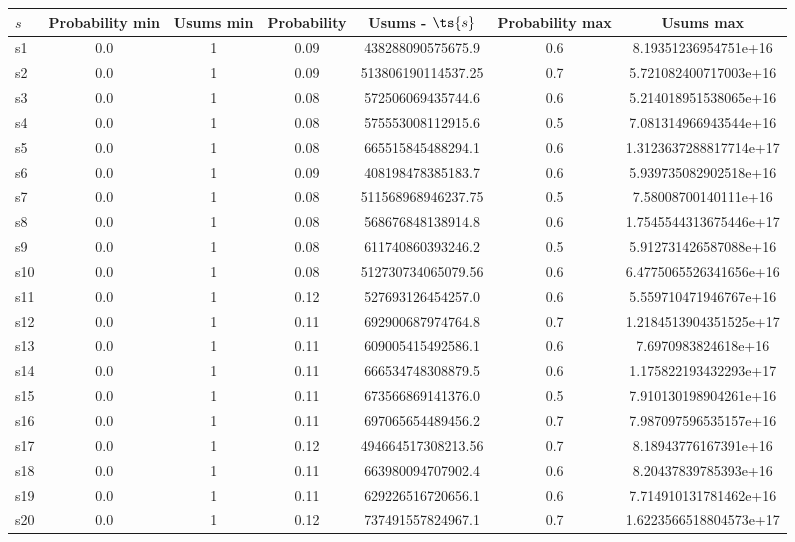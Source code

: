 \documentclass{article}
\begin{document}
\noindent\begin{tabular}{|l|c|c|c|c|c|c|}
\hline
$s$& Probability min & Usums min & Probability & Usums - $\ts{s}$ & Probability max & Usums max\\
\hline
s1 &0.0 & 1 & 0.09 & 438288090575675.9 & 0.6 & 8.19351236954751e+16\\
\hline
s2 &0.0 & 1 & 0.09 & 513806190114537.25 & 0.7 & 5.721082400717003e+16\\
\hline
s3 &0.0 & 1 & 0.08 & 572506069435744.6 & 0.6 & 5.214018951538065e+16\\
\hline
s4 &0.0 & 1 & 0.08 & 575553008112915.6 & 0.5 & 7.081314966943544e+16\\
\hline
s5 &0.0 & 1 & 0.08 & 665515845488294.1 & 0.6 & 1.3123637288817714e+17\\
\hline
s6 &0.0 & 1 & 0.09 & 408198478385183.7 & 0.6 & 5.939735082902518e+16\\
\hline
s7 &0.0 & 1 & 0.08 & 511568968946237.75 & 0.5 & 7.58008700140111e+16\\
\hline
s8 &0.0 & 1 & 0.08 & 568676848138914.8 & 0.6 & 1.7545544313675446e+17\\
\hline
s9 &0.0 & 1 & 0.08 & 611740860393246.2 & 0.5 & 5.912731426587088e+16\\
\hline
s10 &0.0 & 1 & 0.08 & 512730734065079.56 & 0.6 & 6.4775065526341656e+16\\
\hline
s11 &0.0 & 1 & 0.12 & 527693126454257.0 & 0.6 & 5.559710471946767e+16\\
\hline
s12 &0.0 & 1 & 0.11 & 692900687974764.8 & 0.7 & 1.2184513904351525e+17\\
\hline
s13 &0.0 & 1 & 0.11 & 609005415492586.1 & 0.6 & 7.6970983824618e+16\\
\hline
s14 &0.0 & 1 & 0.11 & 666534748308879.5 & 0.6 & 1.175822193432293e+17\\
\hline
s15 &0.0 & 1 & 0.11 & 673566869141376.0 & 0.5 & 7.910130198904261e+16\\
\hline
s16 &0.0 & 1 & 0.11 & 697065654489456.2 & 0.7 & 7.987097596535157e+16\\
\hline
s17 &0.0 & 1 & 0.12 & 494664517308213.56 & 0.7 & 8.18943776167391e+16\\
\hline
s18 &0.0 & 1 & 0.11 & 663980094707902.4 & 0.6 & 8.20437839785393e+16\\
\hline
s19 &0.0 & 1 & 0.11 & 629226516720656.1 & 0.6 & 7.714910131781462e+16\\
\hline
s20 &0.0 & 1 & 0.12 & 737491557824967.1 & 0.7 & 1.6223566518804573e+17\\

\end{tabular}
\end{document}
